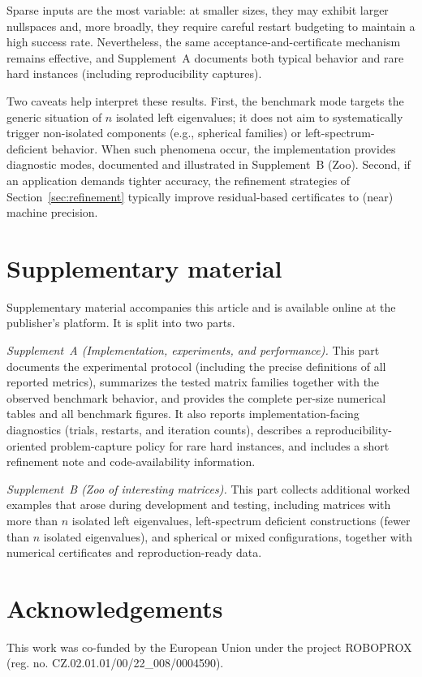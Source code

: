 \documentclass[preprint,12pt]{elsarticle}  %
\theoremstyle{definition}
\theoremstyle{definition}
\theoremstyle{definition}
\theoremstyle{definition}
\theoremstyle{definition}
\theoremstyle{remark}
\theoremstyle{remark}
\theoremstyle{remark}
\begin{document}
Sparse inputs are the most variable: at smaller sizes, they may exhibit larger nullspaces and, more broadly, they require careful restart budgeting to maintain a high success rate. Nevertheless, the same acceptance-and-certificate mechanism remains effective, and Supplement~A documents both typical behavior and rare hard instances (including reproducibility captures).

Two caveats help interpret these results. First, the benchmark mode targets the generic situation of $n$ isolated left eigenvalues; it does not aim to systematically trigger non-isolated components (e.g., spherical families) or
left-spectrum-deficient behavior. When such phenomena occur, the implementation provides diagnostic modes, documented and illustrated in Supplement~B (Zoo). Second, if an application demands tighter accuracy, the refinement strategies of
Section~\ref{sec:refinement} typically improve residual-based certificates to (near) machine precision.

\section*{Supplementary material}
\label{sec:supplementary_material}
Supplementary material accompanies this article and is available online at the publisher's platform.
It is split into two parts.

\emph{Supplement~A (Implementation, experiments, and performance).}
This part documents the experimental protocol (including the precise definitions of all reported metrics), summarizes the tested matrix families together with the observed benchmark behavior, and provides the complete
per-size numerical tables and all benchmark figures.
It also reports implementation-facing diagnostics (trials, restarts, and iteration counts), describes a reproducibility-oriented problem-capture policy for rare hard instances, and includes a short refinement note and code-availability information.

\emph{Supplement~B (Zoo of interesting matrices).}
This part collects additional worked examples that arose during development and testing, including matrices with more than $n$ isolated left eigenvalues, left-spectrum deficient constructions (fewer than $n$ isolated eigenvalues), and spherical or mixed configurations, together with numerical certificates and reproduction-ready data.

\section*{Acknowledgements}
This work was co-funded by the European Union under the project RO\-BO\-PROX (reg. no. CZ.02.01.01/00/22\_008/0004590).
\end{document}
